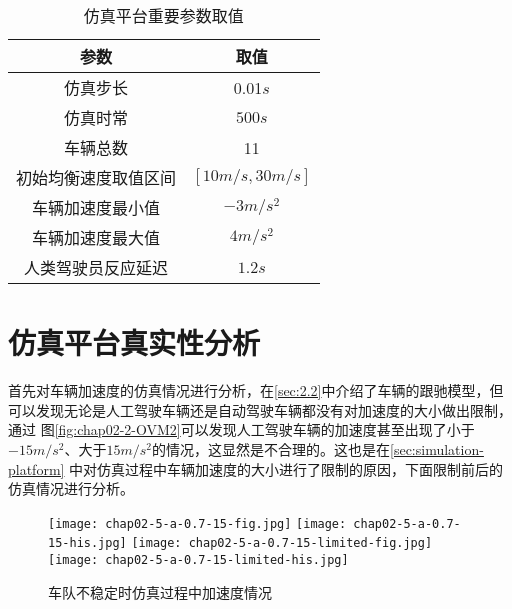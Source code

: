 \begin{table}
  \centering
  \caption{仿真平台重要参数取值}
  \begin{tabular}{cc}
    \toprule
    参数                   &  取值                         \\
    \midrule
    仿真步长                & 0.01$s$         \\
    仿真时常                & $500s$             \\
    车辆总数                & 11              \\
    初始均衡速度取值区间      & $[10m/s, 30m/s]$        \\
    车辆加速度最小值         & $-3m/s^2$     \\
    车辆加速度最大值         & $4m/s^2$ \\
    人类驾驶员反应延迟       & $1.2s$ \\
    \bottomrule
  \end{tabular}
  \label{tab:chap02-3}
\end{table}

\section{仿真平台真实性分析}

首先对车辆加速度的仿真情况进行分析，在\ref{sec:2.2}中介绍了车辆的跟驰模型，但可以发现无论是人工驾驶车辆还是自动驾驶车辆都没有对加速度的大小做出限制，通过
图\ref{fig:chap02-2-OVM2}可以发现人工驾驶车辆的加速度甚至出现了小于$-15m/s^2$、大于$15m/s^2$的情况，这显然是不合理的。这也是在\ref{sec:simulation-platform}
中对仿真过程中车辆加速度的大小进行了限制的原因，下面限制前后的仿真情况进行分析。

\begin{figure}
  \centering
    {\texttt{[image: chap02-5-a-0.7-15-fig.jpg]}}
    {\texttt{[image: chap02-5-a-0.7-15-his.jpg]}}
    {\texttt{[image: chap02-5-a-0.7-15-limited-fig.jpg]}}
    {\texttt{[image: chap02-5-a-0.7-15-limited-his.jpg]}}
  \caption{车队不稳定时仿真过程中加速度情况}
  \label{fig:chap02-5-a}
\end{figure}

